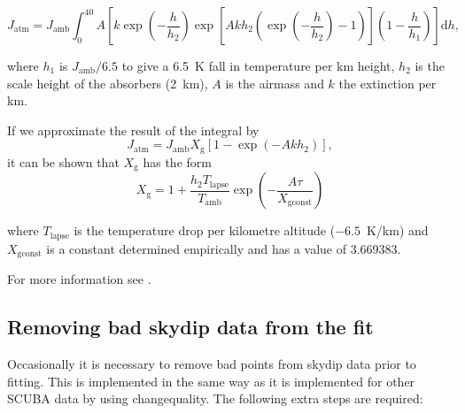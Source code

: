 \documentclass[twoside,11pt]{article}
\newcommand{\task}[1]{{\sf #1}}
\newcommand{\chgqual}{\htmlref{\task{change\_quality}}{CHANGE_QUALITY}}
\newcommand{\htmlref}[2]{#1}
\renewcommand{\_}{\texttt{\symbol{95}}}
\begin{document}
\begin{equation}
J_\mathrm{atm} = J_\mathrm{amb} \int_0^{40}\! A \left[k\exp\left(-\frac{h}{h_2}
\right)\exp\left[A k h_2 \left(\exp\left(-\frac{h}{h_2}\right)-1\right)\right]
\left(1-\frac{h}{h_1}\right)\right]\mathrm{d}h,
\end{equation}

where $h_1$ is $J_\mathrm{amb}/6.5$ to give a 6.5~K fall in temperature per km
height, $h_2$ is the scale height of the absorbers (2~km), $A$ is the airmass
and $k$ the extinction per km.

If we approximate the result of the integral by 
\begin{equation}
J_\mathrm{atm} = J_\mathrm{amb} X_\mathrm{g} \left[1-\exp\left(-A k h_2\right)\right],
\end{equation}
it can be shown that $X_\mathrm{g}$ has the form
\begin{equation}
X_\mathrm{g} = 1 + \frac{h_2 T_\mathrm{lapse}}{T_\mathrm{amb}}\exp\left(-\frac{A \tau}{X_\mathrm{gconst}}\right)
\end{equation}

where $T_\mathrm{lapse}$ is the temperature drop per kilometre altitude
($-6.5$~K/km) and $X_\mathrm{gconst}$ is a constant determined empirically and
has a value of 3.669383.

For more information see \cite{skydip}.

\subsection{Removing bad skydip data from the fit}
\label{skydips_eg}

Occasionally it is necessary to remove bad points from skydip data prior to
fitting. This is implemented in the same way as it is implemented for 
other SCUBA data by using \chgqual. The following extra steps are required:
\end{document}
